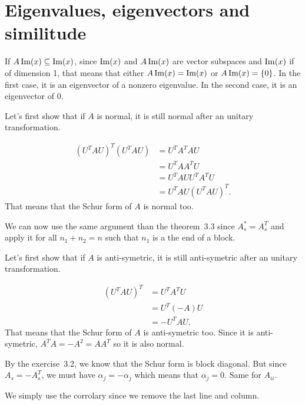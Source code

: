 \section{Eigenvalues, eigenvectors and similitude}
\begin{solution}
  If $A \operatorname{Im}(x) \subseteq \operatorname{Im}(x)$, since $\operatorname{Im}(x)$ and $A\operatorname{Im}(x)$
  are vector subspaces and $\operatorname{Im}(x)$ if of dimension 1,
  that means that either $A\operatorname{Im}(x) = \operatorname{Im}(x)$ or $A\operatorname{Im}(x) = \{0\}$.
  In the first case, it is an eigenvector of a nonzero eigenvalue.
  In the second case, it is an eigenvector of 0.
\end{solution}

\begin{solution}
  Let's first show that if $A$ is normal,
  it is still normal after an unitary transformation.

  \begin{align*}
    (U^TAU)^T(U^TAU)
    & = U^TA^TAU\\
    & = U^TAA^TU\\
    & = U^TAUU^TA^TU\\
    & = U^TAU(U^TAU)^T.
  \end{align*}
  That means that the Schur form of $A$ is normal too.

  We can now use the same argument than the theorem~3.3 since $A_s^* = A_s^T$
  and apply it for all $n_1+n_2 = n$ such that $n_1$ is a the end of a block.
\end{solution}

\begin{solution}
  Let's first show that if $A$ is anti-symetric,
  it is still anti-symetric after an unitary transformation.

  \begin{align*}
    (U^TAU)^T
    & = U^TA^TU\\
    & = U^T(-A)U\\
    & = -U^TAU.
  \end{align*}
  That means that the Schur form of $A$ is anti-symetric too.
  Since it is anti-symetric, $A^TA = -A^2 = AA^T$ so it is also normal.

  By the exercise~3.2, we know that the Schur form is block diagonal.
  But since $A_s = -A_s^T$,
  we must have $\alpha_j = -\alpha_j$ which means that $\alpha_j = 0$.
  Same for $A_{ii}$.
\end{solution}

\begin{solution}
  We simply use the corrolary since we remove the last line and column.
\end{solution}

